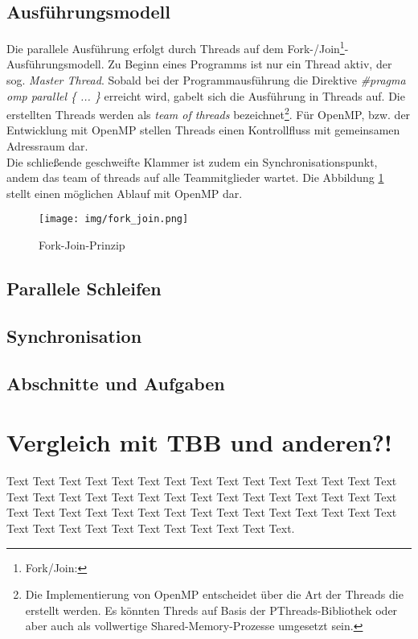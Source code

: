 \documentclass{lni}
\begin{document}
\subsection{Ausführungsmodell}
Die parallele Ausführung erfolgt durch Threads auf dem Fork-/Join\footnote{Fork/Join:}-Ausführungsmodell. Zu Beginn eines Programms ist nur ein Thread aktiv, der sog. \textit{Master Thread}. Sobald bei der Programmausführung die Direktive \textit{\#pragma omp parallel \{ ... \} } erreicht wird, gabelt sich die Ausführung in Threads auf. Die erstellten Threads werden als \textit{team of threads} bezeichnet\footnote{Die Implementierung von OpenMP entscheidet über die Art der Threads die erstellt werden. Es könnten Threds auf Basis der PThreads-Bibliothek oder aber auch als vollwertige Shared-Memory-Prozesse umgesetzt sein.}. Für OpenMP, bzw. der Entwicklung mit OpenMP stellen Threads einen Kontrollfluss mit gemeinsamen Adressraum dar.  \\ 
Die schließende geschweifte Klammer ist zudem ein Synchronisationspunkt, andem das team of threads auf alle Teammitglieder wartet. Die Abbildung \ref{Join-Fork-Modell} stellt einen möglichen Ablauf mit OpenMP dar. 

\begin{figure}[h!]
  \centering
    \texttt{[image: img/fork\_join.png]}
    \label{Join-Fork-Modell}
   \caption{Fork-Join-Prinzip}
\end{figure}



\subsection{Parallele Schleifen}
\subsection{Synchronisation}
\subsection{Abschnitte und Aufgaben}

\pagebreak %

\section{Vergleich mit TBB und anderen?!}

Text Text Text Text Text Text Text Text Text Text Text Text Text Text Text Text Text Text Text Text Text Text Text Text Text Text Text Text Text Text Text Text Text Text Text Text Text Text Text Text Text Text Text Text Text Text Text Text Text Text Text Text Text Text Text Text.
\end{document}
